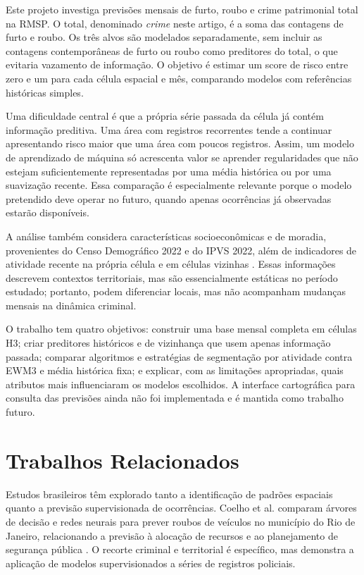 \documentclass[12pt]{article}
\begin{document}
Este projeto investiga previsões mensais de furto, roubo e crime patrimonial total na RMSP. O total, denominado \textit{crime} neste artigo, é a soma das contagens de furto e roubo. Os três alvos são modelados separadamente, sem incluir as contagens contemporâneas de furto ou roubo como preditores do total, o que evitaria vazamento de informação. O objetivo é estimar um score de risco entre zero e um para cada célula espacial e mês, comparando modelos com referências históricas simples.

Uma dificuldade central é que a própria série passada da célula já contém informação preditiva. Uma área com registros recorrentes tende a continuar apresentando risco maior que uma área com poucos registros. Assim, um modelo de aprendizado de máquina só acrescenta valor se aprender regularidades que não estejam suficientemente representadas por uma média histórica ou por uma suavização recente. Essa comparação é especialmente relevante porque o modelo pretendido deve operar no futuro, quando apenas ocorrências já observadas estarão disponíveis.

A análise também considera características socioeconômicas e de moradia, provenientes do Censo Demográfico 2022 e do IPVS 2022, além de indicadores de atividade recente na própria célula e em células vizinhas \cite{ibge_censo_2022,seade_ipvs_2022}. Essas informações descrevem contextos territoriais, mas são essencialmente estáticas no período estudado; portanto, podem diferenciar locais, mas não acompanham mudanças mensais na dinâmica criminal.

O trabalho tem quatro objetivos: construir uma base mensal completa em células H3; criar preditores históricos e de vizinhança que usem apenas informação passada; comparar algoritmos e estratégias de segmentação por atividade contra EWM3 e média histórica fixa; e explicar, com as limitações apropriadas, quais atributos mais influenciaram os modelos escolhidos. A interface cartográfica para consulta das previsões ainda não foi implementada e é mantida como trabalho futuro.

\section{Trabalhos Relacionados}

Estudos brasileiros têm explorado tanto a identificação de padrões espaciais quanto a previsão supervisionada de ocorrências. Coelho et al. comparam árvores de decisão e redes neurais para prever roubos de veículos no município do Rio de Janeiro, relacionando a previsão à alocação de recursos e ao planejamento de segurança pública \cite{coelho2025previsao}. O recorte criminal e territorial é específico, mas demonstra a aplicação de modelos supervisionados a séries de registros policiais.
\end{document}
